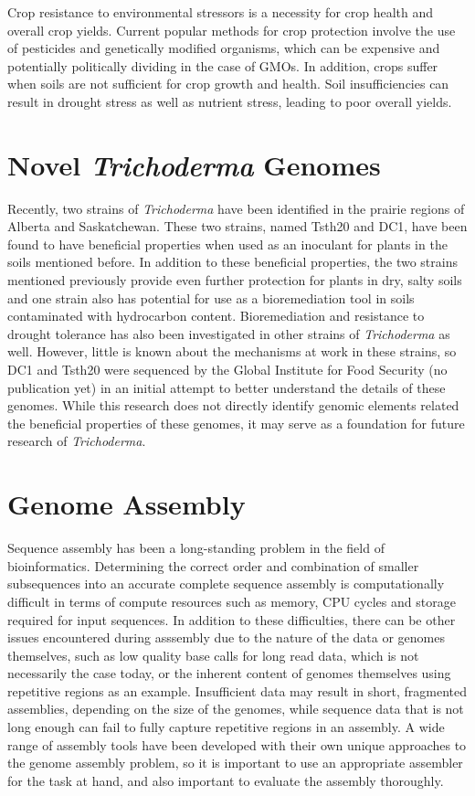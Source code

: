 Crop resistance to environmental stressors is a necessity for crop
health and overall crop yields. Current popular methods for crop
protection involve the use of pesticides and genetically modified
organisms, which can be expensive and potentially politically dividing
in the case of GMOs\cite{doi:10.1080/10408390600762696}. In addition,
crops suffer when soils are not sufficient for crop growth and
health. Soil insufficiencies can result in drought stress as well as
nutrient stress, leading to poor overall yields.

\section{Novel \textit{Trichoderma} Genomes}

Recently, two strains of \textit{Trichoderma}
have been identified in the prairie regions of Alberta and
Saskatchewan. These two strains, named Tsth20 and DC1, have been found
to have beneficial properties when used as an inoculant for plants in
the soils mentioned before. In addition to these beneficial
properties, the two strains mentioned previously provide even further
protection for plants in dry, salty soils and one strain also has
potential for use as a bioremediation tool in soils contaminated with
hydrocarbon content. Bioremediation and resistance to drought
tolerance has also been investigated in other strains of
\textit{Trichoderma} as well\cite{10.3389/fpls.2023.1190304}. However,
little is known about the mechanisms at work in these strains, so DC1
and Tsth20 were sequenced by the Global Institute for Food Security
(no publication yet) in an initial attempt to better understand the
details of these genomes. While this research does not directly
identify genomic elements related the beneficial properties of these
genomes, it may serve as a foundation for future research of
\textit{Trichoderma}.

\section{Genome Assembly}

Sequence assembly has been a long-standing problem in the field of
bioinformatics\cite{Nagarajan2013}. Determining the correct order and
combination of smaller subsequences into an accurate complete sequence
assembly is computationally difficult in terms of compute resources
such as memory, CPU cycles and storage required for input
sequences\cite{Nagarajan2013}. In addition to these difficulties,
there can be other issues encountered during asssembly due to the
nature of the data or genomes themselves, such as low quality base
calls for long read data, which is not necessarily the case today, or
the inherent content of genomes themselves using repetitive regions as
an example. Insufficient data may result in short, fragmented
assemblies, depending on the size of the genomes, while sequence data
that is not long enough can fail to fully capture repetitive regions
in an assembly. A wide range of assembly tools have been developed
with their own unique approaches to the genome assembly problem, so it
is important to use an appropriate assembler for the task at hand, and
also important to evaluate the assembly thoroughly.


